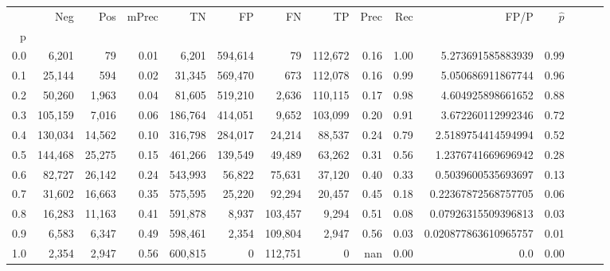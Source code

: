 \begin{tabular}{rrrrrrrrrrrrrrr}
\toprule
{} &      Neg &     Pos & mPrec &       TN &       FP &       FN &       TP &  Prec &   Rec &                  FP/P & $\hat{p}$ \\
p   &          &         &       &          &          &          &          &       &       &                       &           \\
\midrule
0.0 &    6,201 &      79 &  0.01 &    6,201 &  594,614 &       79 &  112,672 &  0.16 &  1.00 &     5.273691585883939 &      0.99 \\
0.1 &   25,144 &     594 &  0.02 &   31,345 &  569,470 &      673 &  112,078 &  0.16 &  0.99 &     5.050686911867744 &      0.96 \\
0.2 &   50,260 &   1,963 &  0.04 &   81,605 &  519,210 &    2,636 &  110,115 &  0.17 &  0.98 &     4.604925898661652 &      0.88 \\
0.3 &  105,159 &   7,016 &  0.06 &  186,764 &  414,051 &    9,652 &  103,099 &  0.20 &  0.91 &     3.672260112992346 &      0.72 \\
0.4 &  130,034 &  14,562 &  0.10 &  316,798 &  284,017 &   24,214 &   88,537 &  0.24 &  0.79 &    2.5189754414594994 &      0.52 \\
0.5 &  144,468 &  25,275 &  0.15 &  461,266 &  139,549 &   49,489 &   63,262 &  0.31 &  0.56 &    1.2376741669696942 &      0.28 \\
0.6 &   82,727 &  26,142 &  0.24 &  543,993 &   56,822 &   75,631 &   37,120 &  0.40 &  0.33 &    0.5039600535693697 &      0.13 \\
0.7 &   31,602 &  16,663 &  0.35 &  575,595 &   25,220 &   92,294 &   20,457 &  0.45 &  0.18 &   0.22367872568757705 &      0.06 \\
0.8 &   16,283 &  11,163 &  0.41 &  591,878 &    8,937 &  103,457 &    9,294 &  0.51 &  0.08 &   0.07926315509396813 &      0.03 \\
0.9 &    6,583 &   6,347 &  0.49 &  598,461 &    2,354 &  109,804 &    2,947 &  0.56 &  0.03 &  0.020877863610965757 &      0.01 \\
1.0 &    2,354 &   2,947 &  0.56 &  600,815 &        0 &  112,751 &        0 &   nan &  0.00 &                   0.0 &      0.00 \\
\bottomrule
\end{tabular}
